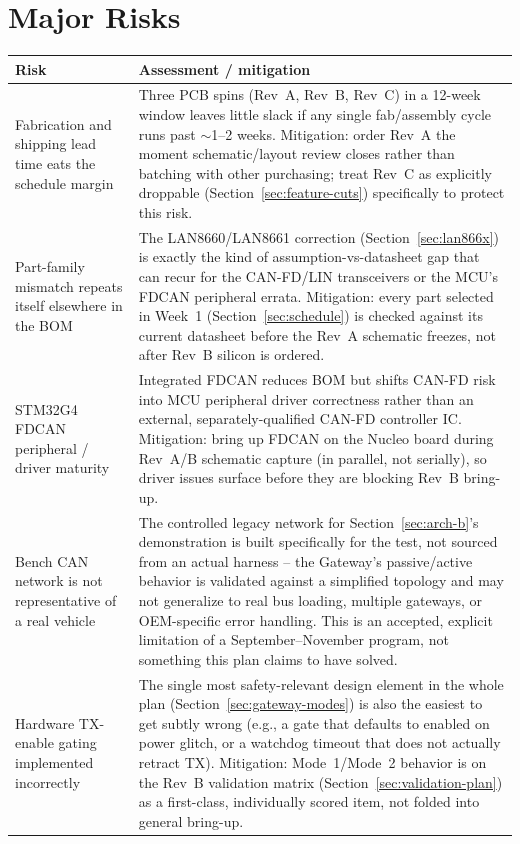 \section{Major Risks}
\label{sec:risks}

\begin{center}
\small
\begin{tabularx}{\linewidth}{@{}p{3.6cm} X@{}}
\toprule
\textbf{Risk} & \textbf{Assessment / mitigation} \\
\midrule
Fabrication and shipping lead time eats the schedule margin & Three PCB spins (Rev~A, Rev~B, Rev~C) in a 12-week window leaves little slack if any single fab/assembly cycle runs past $\sim$1--2 weeks. Mitigation: order Rev~A the moment schematic/layout review closes rather than batching with other purchasing; treat Rev~C as explicitly droppable (Section~\ref{sec:feature-cuts}) specifically to protect this risk. \\
Part-family mismatch repeats itself elsewhere in the BOM & The LAN8660/LAN8661 correction (Section~\ref{sec:lan866x}) is exactly the kind of assumption-vs-datasheet gap that can recur for the CAN-FD/LIN transceivers or the MCU's FDCAN peripheral errata. Mitigation: every part selected in Week~1 (Section~\ref{sec:schedule}) is checked against its current datasheet before the Rev~A schematic freezes, not after Rev~B silicon is ordered. \\
STM32G4 FDCAN peripheral / driver maturity & Integrated FDCAN reduces BOM but shifts CAN-FD risk into MCU peripheral driver correctness rather than an external, separately-qualified CAN-FD controller IC. Mitigation: bring up FDCAN on the Nucleo board during Rev~A/B schematic capture (in parallel, not serially), so driver issues surface before they are blocking Rev~B bring-up. \\
Bench CAN network is not representative of a real vehicle & The controlled legacy network for Section~\ref{sec:arch-b}'s demonstration is built specifically for the test, not sourced from an actual harness -- the Gateway's passive/active behavior is validated against a simplified topology and may not generalize to real bus loading, multiple gateways, or OEM-specific error handling. This is an accepted, explicit limitation of a September--November program, not something this plan claims to have solved. \\
Hardware TX-enable gating implemented incorrectly & The single most safety-relevant design element in the whole plan (Section~\ref{sec:gateway-modes}) is also the easiest to get subtly wrong (e.g., a gate that defaults to enabled on power glitch, or a watchdog timeout that does not actually retract TX). Mitigation: Mode~1/Mode~2 behavior is on the Rev~B validation matrix (Section~\ref{sec:validation-plan}) as a first-class, individually scored item, not folded into general bring-up. \\

\end{tabularx}
\end{center}
